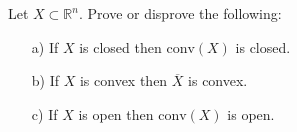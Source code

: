 Let $X\subset\mathbb{R}^{n}$. Prove or disprove the following:
\begin{enumerate}
\item[a)] If $X$ is closed then $\text{conv}(X)$ is closed.
\item[b)] If $X$ is convex then $\overline{X}$ is convex.
\item[c)] If $X$ is open then $\text{conv}(X)$ is open.
\end{enumerate}
